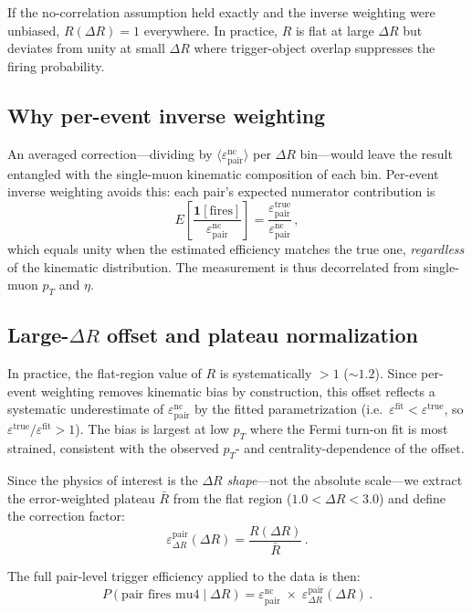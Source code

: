 \documentclass[11pt]{article}
\begin{document}
If the no-correlation assumption held exactly and the inverse weighting were unbiased, $R(\Delta R) = 1$ everywhere. In practice, $R$ is flat at large $\Delta R$ but deviates from unity at small $\Delta R$ where trigger-object overlap suppresses the firing probability.

\subsection*{Why per-event inverse weighting}

An averaged correction---dividing by $\langle\varepsilon_{\text{pair}}^{\text{nc}}\rangle$ per $\Delta R$ bin---would leave the result entangled with the single-muon kinematic composition of each bin. Per-event inverse weighting avoids this: each pair's expected numerator contribution is
\begin{equation}
  E\!\left[\frac{\mathbf{1}[\text{fires}]}{\varepsilon_{\text{pair}}^{\text{nc}}}\right]
  = \frac{\varepsilon_{\text{pair}}^{\text{true}}}{\varepsilon_{\text{pair}}^{\text{nc}}} \,,
\end{equation}
which equals unity when the estimated efficiency matches the true one, \emph{regardless} of the kinematic distribution. The measurement is thus decorrelated from single-muon $p_T$ and $\eta$.

\subsection*{Large-$\Delta R$ offset and plateau normalization}

In practice, the flat-region value of $R$ is systematically $> 1$ ($\sim 1.2$). Since per-event weighting removes kinematic bias by construction, this offset reflects a systematic underestimate of $\varepsilon_{\text{pair}}^{\text{nc}}$ by the fitted parametrization (i.e.\ $\varepsilon^{\text{fit}} < \varepsilon^{\text{true}}$, so $\varepsilon^{\text{true}}/\varepsilon^{\text{fit}} > 1$). The bias is largest at low $p_T$ where the Fermi turn-on fit is most strained, consistent with the observed $p_T$- and centrality-dependence of the offset.

Since the physics of interest is the $\Delta R$ \emph{shape}---not the absolute scale---we extract the error-weighted plateau $\bar{R}$ from the flat region ($1.0 < \Delta R < 3.0$) and define the correction factor:
\begin{equation}
  \varepsilon_{\Delta R}^{\text{pair}}(\Delta R) = \frac{R(\Delta R)}{\bar{R}}\,.
\end{equation}

The full pair-level trigger efficiency applied to the data is then:
\begin{equation}
  P(\text{pair fires mu4}\mid\Delta R) = \varepsilon_{\text{pair}}^{\text{nc}}\;\times\;\varepsilon_{\Delta R}^{\text{pair}}(\Delta R)\,.
\end{equation}
\end{document}
